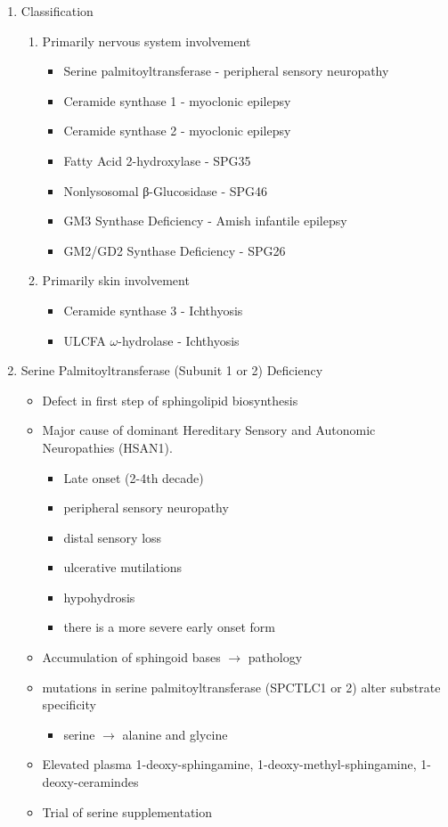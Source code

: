 \documentclass{scrartcl}
\begin{document}
\begin{enumerate}
\item Classification
\label{sec:orgad9bae6}

\begin{enumerate}
\item Primarily nervous system involvement
\label{sec:orgf84d61b}
\begin{itemize}
\item Serine palmitoyltransferase - peripheral sensory neuropathy
\item Ceramide synthase 1 - myoclonic epilepsy
\item Ceramide synthase 2 - myoclonic epilepsy
\item Fatty Acid 2-hydroxylase - SPG35
\item Nonlysosomal β-Glucosidase - SPG46
\item GM3 Synthase Deficiency - Amish infantile epilepsy
\item GM2/GD2 Synthase Deficiency - SPG26
\end{itemize}

\item Primarily skin involvement
\label{sec:org4beb507}
\begin{itemize}
\item Ceramide synthase 3 - Ichthyosis
\item ULCFA \(\omega\)-hydrolase - Ichthyosis
\end{itemize}
\end{enumerate}


\item Serine Palmitoyltransferase (Subunit 1 or 2) Deficiency
\label{sec:org2887cfd}

\begin{itemize}
\item Defect in first step of sphingolipid biosynthesis
\item Major cause of dominant Hereditary Sensory and Autonomic Neuropathies (HSAN1).
\begin{itemize}
\item Late onset (2-4th decade)
\item peripheral sensory neuropathy
\item distal sensory loss
\item ulcerative mutilations
\item hypohydrosis
\item there is a more severe early onset form
\end{itemize}
\item Accumulation of sphingoid bases \(\to\) pathology
\item mutations in serine palmitoyltransferase (SPCTLC1 or 2) alter
substrate specificity
\begin{itemize}
\item serine \(\to\) alanine and glycine
\end{itemize}
\item Elevated plasma 1-deoxy-sphingamine, 1-deoxy-methyl-sphingamine, 1-deoxy-ceramindes
\item Trial of serine supplementation
\end{itemize}


\end{enumerate}
\end{document}
